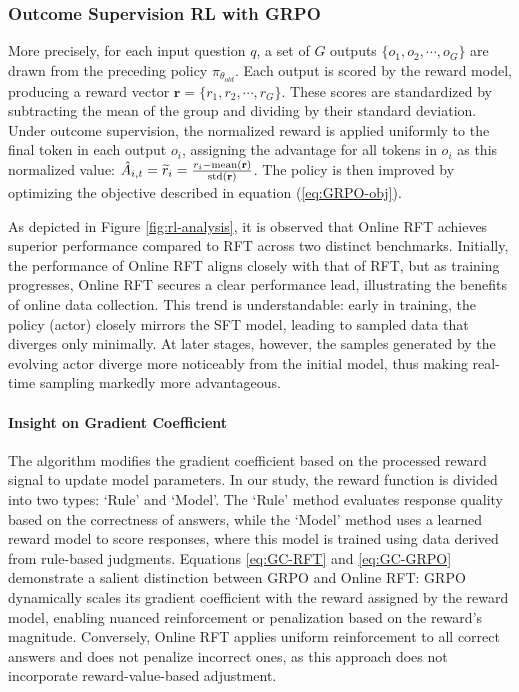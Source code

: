 \subsubsection{Outcome Supervision RL with GRPO}
More precisely, for each input question $q$, a set of $G$ outputs $\{o_1, o_2, \cdots, o_G\}$ are drawn from the preceding policy $\pi_{\theta_{old}}$. Each output is scored by the reward model, producing a reward vector $\mathbf{r}=\{r_1, r_2, \cdots, r_G\}$. These scores are standardized by subtracting the mean of the group and dividing by their standard deviation. Under outcome supervision, the normalized reward is applied uniformly to the final token in each output $o_i$, assigning the advantage for all tokens in $o_i$ as this normalized value: $\hat{A}_{i, t} = \widetilde{r}_i = \frac{r_i- {\rm mean}(\mathbf{r})}{{\rm std}(\mathbf{r})}$. The policy is then improved by optimizing the objective described in equation (\ref{eq:GRPO-obj}).

As depicted in Figure \ref{fig:rl-analysis}, it is observed that Online RFT achieves superior performance compared to RFT across two distinct benchmarks. Initially, the performance of Online RFT aligns closely with that of RFT, but as training progresses, Online RFT secures a clear performance lead, illustrating the benefits of online data collection. This trend is understandable: early in training, the policy (actor) closely mirrors the SFT model, leading to sampled data that diverges only minimally. At later stages, however, the samples generated by the evolving actor diverge more noticeably from the initial model, thus making real-time sampling markedly more advantageous.

\paragraph{Insight on Gradient Coefficient} The algorithm modifies the gradient coefficient based on the processed reward signal to update model parameters. In our study, the reward function is divided into two types: `Rule' and `Model'. The `Rule' method evaluates response quality based on the correctness of answers, while the `Model' method uses a learned reward model to score responses, where this model is trained using data derived from rule-based judgments. Equations \ref{eq:GC-RFT} and \ref{eq:GC-GRPO} demonstrate a salient distinction between GRPO and Online RFT: GRPO dynamically scales its gradient coefficient with the reward assigned by the reward model, enabling nuanced reinforcement or penalization based on the reward's magnitude. Conversely, Online RFT applies uniform reinforcement to all correct answers and does not penalize incorrect ones, as this approach does not incorporate reward-value-based adjustment.

